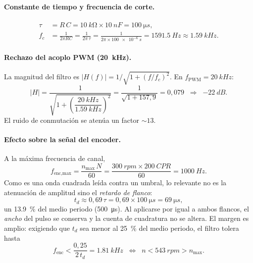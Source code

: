 \documentclass[11pt,letterpaper]{article}
\begin{document}
\paragraph{Constante de tiempo y frecuencia de corte.}
\begin{align}
  \tau &= R\,C = \SI{10}{k\ohm}\times\SI{10}{nF} = \SI{100}{\micro s}, \\
  f_c  &= \frac{1}{2\pi RC} = \frac{1}{2\pi\,\tau}
        = \frac{1}{2\pi\times\SI{100e-6}{s}} = \SI{1591.5}{Hz}\approx\SI{1.59}{kHz}.
\end{align}

\paragraph{Rechazo del acoplo PWM (\SI{20}{kHz}).} La magnitud del filtro es
$|H(f)|=1/\sqrt{1+(f/f_c)^2}$. En $f_\text{PWM}=\SI{20}{kHz}$:
\begin{equation}
  |H| = \frac{1}{\sqrt{1+\left(\dfrac{\SI{20}{kHz}}{\SI{1.59}{kHz}}\right)^2}}
      = \frac{1}{\sqrt{1+157{,}9}} = 0{,}079
      \;\;\Rightarrow\;\; \SI{-22}{dB}.
\end{equation}
El ruido de conmutación se atenúa un factor $\sim\!13$.

\paragraph{Efecto sobre la señal del encoder.} A la máxima frecuencia de canal,
\begin{equation}
  f_\text{enc,max} = \frac{n_\text{max}\,N}{60}
  = \frac{\SI{300}{rpm}\times\SI{200}{CPR}}{60} = \SI{1000}{Hz}.
\end{equation}
Como es una onda cuadrada leída contra un umbral, lo relevante no es la atenuación
de amplitud sino el \emph{retardo de flanco}:
\begin{equation}
  t_d \approx 0{,}69\,\tau = 0{,}69\times\SI{100}{\micro s} = \SI{69}{\micro s},
\end{equation}
un \SI{13.9}{\percent} del medio periodo (\SI{500}{\micro s}). Al aplicarse por
igual a ambos flancos, el \emph{ancho} del pulso se conserva y la cuenta de
cuadratura no se altera. El margen es amplio: exigiendo que $t_d$ sea menor al
\SI{25}{\percent} del medio periodo, el filtro tolera hasta
\begin{equation}
  f_\text{enc} < \frac{0{,}25}{2\,t_d} = \SI{1.81}{kHz}
  \;\;\Longleftrightarrow\;\; n < \SI{543}{rpm} > n_\text{max}.
\end{equation}
\end{document}

